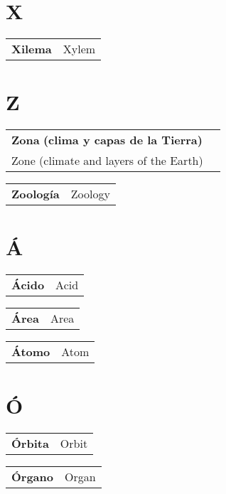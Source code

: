 \documentclass[a5paper,10pt]{book}
\makeatletter
\newcommand{\entry}[2]{%
  \noindent\begin{tabularx}{\linewidth}{@{}X@{}r@{}}
    \textbf{#1}\dotfill & #2 \\
  \end{tabularx}
}
\newcommand{\multientry}[3]{%
  \noindent\begin{tabularx}{\linewidth}{@{}X@{}r@{}}
    \textbf{#1}  \textbf{ #2} & \\[-0.5ex]
    \dotfill  #3 \\
  \end{tabularx}
}
\makeatother
\begin{document}
\begin{multicols}{2}
\section*{X}
\entry{Xilema}{Xylem}
\section*{Z}
\multientry{Zona}{(clima y capas de la Tierra)}{Zone (climate and layers of the Earth)}
\entry{Zoología}{Zoology}
\section*{Á}
\entry{Ácido}{Acid}
\entry{Área}{Area}
\entry{Átomo}{Atom}
\section*{Ó}
\entry{Órbita}{Orbit}
\entry{Órgano}{Organ}
\end{multicols}
\backmatter
\end{document}
